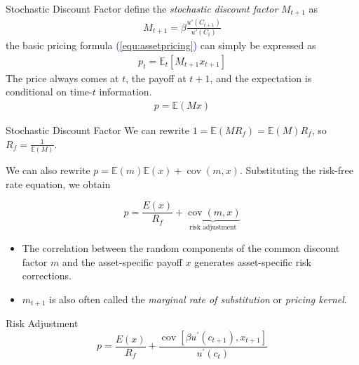 \documentclass{beamer}
\begin{document}
\begin{frame}{Stochastic Discount Factor}
	define the \alert{\textit{stochastic discount factor}} $M_{t+1}$ as
	\begin{align*}
		M_{t+1} = \beta \frac{{u}'(C_{t+1})}{{u}'(C_t)}
	\end{align*}
	the basic pricing formula \textcolor{blue}{(\ref{equ:assetpricing})} can simply be expressed as
	\begin{align}
		p_{t} = \mathbb{E}_{t} \left [ M_{t+1}x_{t+1} \right ]
		\label{equ:assetpricing2}
	\end{align}
	The price always comes at $ t $, the payoff at $ t + 1 $, and the expectation is conditional on time-$ t $ information.
	\begin{align*}
		p = \mathbb{E}(Mx)
	\end{align*}
\end{frame}

\begin{frame}{Stochastic Discount Factor}
		We can rewrite $ 1 = \mathbb{E}(M R_f) =  \mathbb{E}(M)  R_f$, so $ R_f = \frac{1}{\mathbb{E}(M)} $.

		We can also rewrite $p=\mathbb{E}(m) \mathbb{E}(x)+\operatorname{cov}(m, x)$. Substituting the risk-free rate equation, we obtain

		\begin{equation*}
			p=\frac{E(x)}{R_f}+ \underbrace{\operatorname{cov}(m, x)}_{\text {risk adjustment}}
		\end{equation*}

	\begin{itemize}
		\item The correlation between the random components of the common discount factor $m$  and the asset-specific payoff $x$ generates asset-specific risk corrections.
		\item $m_{t+1} $ is also often called the \textit{marginal rate of substitution} or \textit{pricing kernel}.
	\end{itemize}
\end{frame}

\begin{frame}{Risk Adjustment}
	\begin{equation*}
		p=\frac{E(x)}{R_f}+\frac{\operatorname{cov}\left[\beta u^{\prime}\left(c_{t+1}\right), x_{t+1}\right]}{u^{\prime}\left(c_t\right)}
	\end{equation*}
\end{frame}
\end{document}
